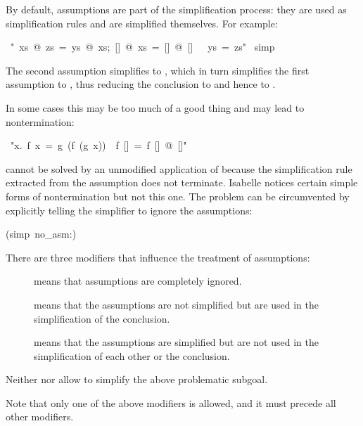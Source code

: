 \begin{isabelle}%
%
\begin{isamarkuptext}%
By default, assumptions are part of the simplification process: they are used
as simplification rules and are simplified themselves. For example:%
\end{isamarkuptext}%
~{"}{\isasymlbrakk}~xs~@~zs~=~ys~@~xs;~[]~@~xs~=~[]~@~[]~{\isasymrbrakk}~{\isasymLongrightarrow}~ys~=~zs{"}\isanewline
{}~simp%
\begin{isamarkuptext}%
\noindent
The second assumption simplifies to , which in turn
simplifies the first assumption to , thus reducing the
conclusion to  and hence to .

In some cases this may be too much of a good thing and may lead to
nontermination:%
\end{isamarkuptext}%
~{"}{\isasymforall}x.~f~x~=~g~(f~(g~x))~{\isasymLongrightarrow}~f~[]~=~f~[]~@~[]{"}%
\begin{isamarkuptxt}%
\noindent
cannot be solved by an unmodified application of  because the
simplification rule  extracted from the assumption
does not terminate. Isabelle notices certain simple forms of
nontermination but not this one. The problem can be circumvented by
explicitly telling the simplifier to ignore the assumptions:%
\end{isamarkuptxt}%
(simp~no\_asm:)%
\begin{isamarkuptext}%
\noindent
There are three modifiers that influence the treatment of assumptions:
\begin{description}
\item[] means that assumptions are completely ignored.
\item[] means that the assumptions are not simplified but
  are used in the simplification of the conclusion.
\item[] means that the assumptions are simplified
but are not
  used in the simplification of each other or the conclusion.
\end{description}
Neither  nor  allow to simplify the above
problematic subgoal.

Note that only one of the above modifiers is allowed, and it must precede all
other modifiers.%
\end{isamarkuptext}%
\end{isabelle}%
